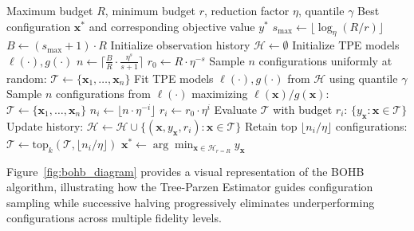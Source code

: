 \begin{algorithm}[htbp]
\caption{Bayesian Optimization with Hyperband (BOHB)}
\label{alg:bohb}
\begin{algorithmic}[1]
\Require Maximum budget $R$, minimum budget $r$, reduction factor $\eta$, quantile $\gamma$
\Ensure Best configuration $\mathbf{x}^*$ and corresponding objective value $y^*$
\State $s_{\max} \gets \lfloor \log_\eta(R/r) \rfloor$
\State $B \gets (s_{\max} + 1) \cdot R$ 
\State Initialize observation history $\mathcal{H} \gets \emptyset$
\State Initialize TPE models $\ell(\cdot), g(\cdot)$
     
        \State $n \gets \lceil \frac{B}{R} \cdot \frac{\eta^s}{s+1} \rceil$ 
        \State $r_0 \gets R \cdot \eta^{-s}$ 
            \State Sample $n$ configurations uniformly at random: $\mathcal{T} \gets \{\mathbf{x}_1, \ldots, \mathbf{x}_n\}$
        \Else
            \State Fit TPE models $\ell(\cdot), g(\cdot)$ from $\mathcal{H}$ using quantile $\gamma$
            \State Sample $n$ configurations from $\ell(\cdot)$ maximizing $\ell(\mathbf{x})/g(\mathbf{x})$: $\mathcal{T} \gets \{\mathbf{x}_1, \ldots, \mathbf{x}_n\}$
        \EndIf
         
            \State $n_i \gets \lfloor n \cdot \eta^{-i} \rfloor$
            \State $r_i \gets r_0 \cdot \eta^i$
            \State Evaluate $\mathcal{T}$ with budget $r_i$: $\{y_{\mathbf{x}} : \mathbf{x} \in \mathcal{T}\}$
            \State Update history: $\mathcal{H} \gets \mathcal{H} \cup \{(\mathbf{x}, y_{\mathbf{x}}, r_i) : \mathbf{x} \in \mathcal{T}\}$
            \State Retain top $\lfloor n_i / \eta \rfloor$ configurations: $\mathcal{T} \gets \text{top}_k(\mathcal{T}, \lfloor n_i / \eta \rfloor)$
        \EndFor
    \EndFor
\EndFor
\State \Return $\mathbf{x}^* \gets \arg\min_{\mathbf{x} \in \mathcal{H}_{r=R}} y_{\mathbf{x}}$
\end{algorithmic}
\end{algorithm}

Figure~\ref{fig:bohb_diagram} provides a visual representation of the BOHB algorithm, illustrating how the Tree-Parzen Estimator guides configuration sampling while successive halving progressively eliminates underperforming configurations across multiple fidelity levels.

